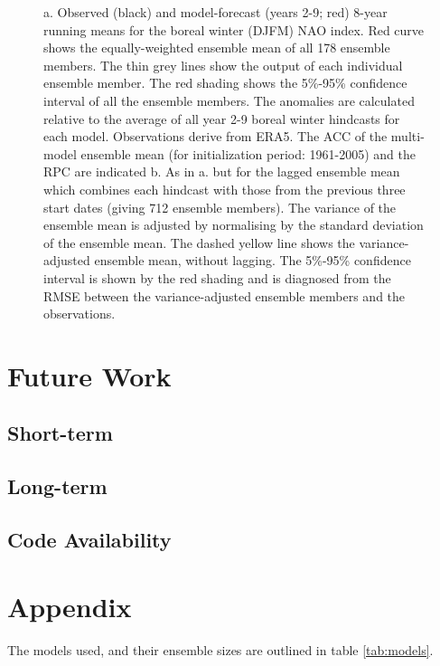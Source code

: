 \documentclass{article}
\begin{document}
\begin{figure}
     \caption{ a. Observed (black) and model-forecast (years 2-9; red) 8-year running means for the boreal winter (DJFM) NAO index. Red curve shows the equally-weighted ensemble mean of all 178 ensemble members. The thin grey lines show the output of each individual ensemble member. The red shading shows the 5\%-95\% confidence interval of all the ensemble members. The anomalies are calculated relative to the average of all year 2-9 boreal winter hindcasts for each model. Observations derive from ERA5. The ACC of the multi-model ensemble mean (for initialization period: 1961-2005) and the RPC are indicated b. As in a. but for the lagged ensemble mean which combines each hindcast with those from the previous three start dates (giving 712 ensemble members). The variance of the ensemble mean is adjusted by normalising by the standard deviation of the ensemble mean. The dashed yellow line shows the variance-adjusted ensemble mean, without lagging. The 5\%-95\% confidence interval is shown by the red shading and is diagnosed from the RMSE between the variance-adjusted ensemble members and the observations.}
     \label{fig:multi-model-means}
\end{figure}


\section*{Future Work}

\subsection{Short-term}

\subsection{Long-term}

\subsection*{Code Availability}

\printbibliography

\section*{Appendix}

The models used, and their ensemble sizes are outlined in table \ref{tab:models}.
\end{document}
